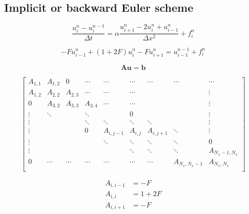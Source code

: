 \documentclass[a4paper,12pt]{article}
\begin{document}
\subsection{Implicit or backward Euler scheme}

\begin{equation}
\frac{u_{i}^{n} - u_{i}^{n-1}}{\Delta t} = \alpha
\frac{u^{n}_{i+1} - 2u^{n}_{i} + u^{n}_{i-1}}{\Delta x^2} + f_{i}^{n}
\end{equation}

\begin{equation}
-Fu_{i-1}^{n} + (1 + 2F)u_{i}^{n} - F u_{i+1}^{n} = u^{n-1}_{i-1} + f^{n}_{i}
\end{equation}

\begin{equation}
\mathbf{A}\mathbf{u} = \mathbf{b}
\end{equation}


\begin{equation}
\begin{bmatrix}
A_{1,1} & A_{1,2} & 0       & \cdots  & \cdots    & \cdots  & \cdots    & \cdots        & \cdots \\
A_{1,2} & A_{2,2} & A_{2,3} & \cdots  & \cdots    & \cdots  &           &               & \vdots \\
0       & A_{3,2} & A_{3,3} & A_{3,4} & \cdots    & \cdots  &           &               & \vdots \\
\vdots  & \ddots  &         & \ddots  &           &  0      &           &               & \vdots \\
\vdots  &         &         & \ddots  & \ddots    & \ddots  & \ddots    &               & \vdots \\
\vdots  &         &         & 0       & A_{i,j-1} & A_{i,j} & A_{i,j+1} & \ddots        & \vdots \\
\vdots  &         &         &         & \ddots    & \ddots  & \ddots    & \ddots        & 0 \\
\vdots  &         &         &         &           & \ddots  & \ddots    & \ddots        & A_{N_x-1,N_x} \\
0       & \cdots  & \cdots  & \cdots  & \cdots    & \cdots  & \cdots    & A_{N_x,N_x-1} & A_{N_x,N_x} \\
\end{bmatrix}
\end{equation}

\begin{align*}
A_{i,i-1} & = -F \\
A_{i,i}   & = 1 + 2F \\
A_{i,i+1} & = -F
\end{align*}
\end{document}
